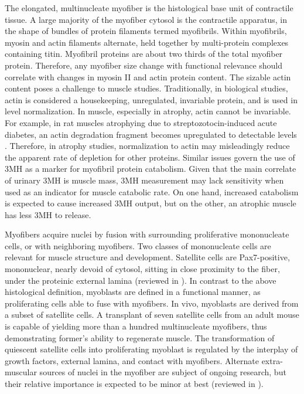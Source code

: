 \documentclass[12pt,english]{report}\usepackage[]{graphicx}\usepackage[]{color}
\begin{document}
The elongated, multinucleate myofiber is the histological base unit
of contractile tissue. A large majority of the myofiber cytosol is
the contractile apparatus, in the shape of bundles of protein filaments
termed myofibrils. Within myofibrils, myosin and actin filaments alternate,
held together by multi-protein complexes containing titin. Myofibril
proteins are about two thirds of the total myofiber protein\citep{waterlow1978protein}.
Therefore, any myofiber size change with functional relevance should
correlate with changes in myosin II and actin protein content. The
sizable actin content poses a challenge to muscle studies. Traditionally,
in biological studies, actin is considered a housekeeping, unregulated,
invariable protein, and is used in level normalization. In muscle,
especially in atrophy, actin cannot be invariable. For example, in
rat muscles atrophying due to streptozotocin-induced acute diabetes,
an actin degradation fragment becomes upregulated to detectable levels
\citep{du2004activation}. Therefore, in atrophy studies, normalization
to actin may misleadingly reduce the apparent rate of depletion for
other proteins. Similar issues govern the use of 3MH as a marker for
myofibril protein catabolism. Given that the main correlate of urinary
3MH is muscle mass\citep{lukaski1981relationship}, 3MH measurement
may lack sensitivity when used as an indicator for muscle catabolic
rate. On one hand, increased catabolism is expected to cause increased
3MH output, but on the other, an atrophic muscle has less 3MH to release.

Myofibers acquire nuclei by fusion with surrounding proliferative
mononucleate cells, or with neighboring myofibers. Two classes of
mononucleate cells are relevant for muscle structure and development.
Satellite cells are Pax7-positive, mononuclear, nearly devoid of cytosol,
sitting in close proximity to the fiber, under the proteinic external
lamina (reviewed in \citep{scharner2011muscle}). In contrast to the
above histological definition, myoblasts are defined in a functional
manner, as proliferating cells able to fuse with myofibers. In vivo,
myoblasts are derived from a subset of satellite cells. A transplant
of seven satellite cells from an adult mouse is capable of yielding
more than a hundred multinucleate myofibers, thus demonstrating former's
ability to regenerate muscle\citep{collins2005stem}. The transformation
of quiescent satellite cells into proliferating myoblast is regulated
by the interplay of growth factors, external lamina, and contact with
myofibers\citep{bischoff1986proliferation}. Alternate extra-muscular
sources of nuclei in the myofiber are subject of ongoing research,
but their relative importance is expected to be minor at best (reviewed
in \citep{yin2013satellite}).
\end{document}

